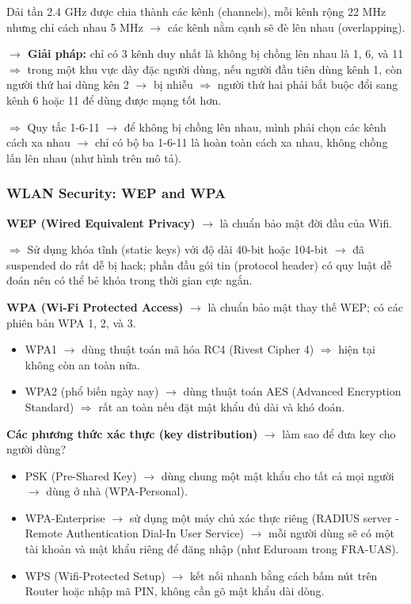 \noindent
Dải tần 2.4 GHz được chia thành các kênh (channels), mỗi kênh rộng 22 MHz nhưng chỉ cách nhau 5 MHz $\rightarrow$ các kênh nằm cạnh sẽ đè lên nhau (overlapping).
\medskip

\noindent
\textbf{$\rightarrow$ Giải pháp:} chỉ có 3 kênh duy nhất là không bị chồng lên nhau là 1, 6, và 11 $\Rightarrow$ trong một khu vực dày đặc người dùng, nếu người đầu tiên dùng kênh 1, còn người thứ hai dùng kên 2 $\rightarrow$ bị nhiễu $\Rightarrow$ người thứ hai phải bắt buộc đổi sang kênh 6 hoặc 11 để dùng được mạng tốt hơn.

$\Rightarrow$ Quy tắc 1-6-11 $\rightarrow$ để không bị chồng lên nhau, mình phải chọn các kênh cách xa nhau $\rightarrow$ chỉ có bộ ba 1-6-11 là hoàn toàn cách xa nhau, không chồng lấn lên nhau (như hình trên mô tả).
\medskip


\subsubsection{WLAN Security: WEP and WPA}

\noindent
\textbf{WEP (Wired Equivalent Privacy)} $\rightarrow$ là chuẩn bảo mật đời đầu của Wifi.

$\Rightarrow$ Sử dụng khóa tĩnh (static keys) với độ dài 40-bit hoặc 104-bit $\rightarrow$ đã suspended do rất dễ bị hack; phần đầu gói tin (protocol header) có quy luật dễ đoán nên có thể bẻ khóa trong thời gian cực ngắn.
\medskip

\noindent
\textbf{WPA (Wi-Fi Protected Access)} $\rightarrow$ là chuẩn bảo mật thay thế WEP; có các phiên bản WPA 1, 2, và 3.

\begin{itemize}
    \item WPA1 $\rightarrow$ dùng thuật toán mã hóa RC4 (Rivest Cipher 4) $\Rightarrow$ hiện tại không còn an toàn nữa.
    \item WPA2 (phổ biến ngày nay) $\rightarrow$ dùng thuật toán AES (Advanced Encryption Standard) $\Rightarrow$ rất an toàn nếu đặt mật khẩu đủ dài và khó đoán.
\end{itemize}

\noindent
\textbf{Các phương thức xác thực (key distribution)} $\rightarrow$ làm sao để đưa key cho người dùng?

\begin{itemize}
    \item PSK (Pre-Shared Key) $\rightarrow$ dùng chung một mật khẩu cho tất cả mọi người $\rightarrow$ dùng ở nhà (WPA-Personal).
    \item WPA-Enterprise $\rightarrow$ sử dụng một máy chủ xác thực riêng (RADIUS server - Remote Authentication Dial-In User Service) $\rightarrow$ mỗi người dùng sẽ có một tài khoản và mật khẩu riêng để đăng nhập (như Eduroam trong FRA-UAS).
    \item WPS (Wifi-Protected Setup) $\rightarrow$ kết nối nhanh bằng cách bấm nút trên Router hoặc nhập mã PIN, không cần gõ mật khẩu dài dòng.
\end{itemize}

